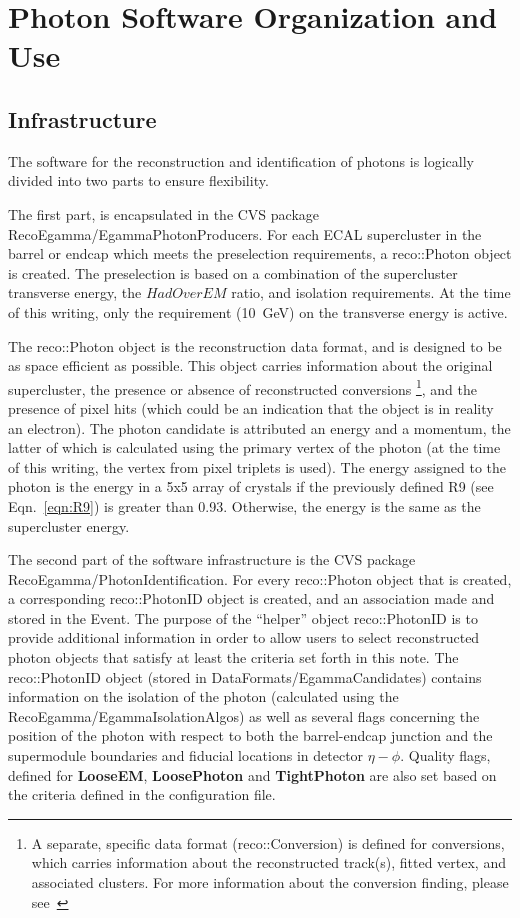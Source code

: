 \documentclass{cmspaper}
\begin{document}
\section{Photon Software Organization and Use}
\subsection{Infrastructure}
The software for the reconstruction and identification of photons is logically
divided into two parts to ensure flexibility.  


The first part, is encapsulated in the CVS package RecoEgamma/EgammaPhotonProducers.  
For each ECAL supercluster in the barrel or endcap which meets the 
preselection requirements, a reco::Photon object is created.  The preselection is based
on a combination of the supercluster transverse energy, the $HadOverEM$ ratio, and
isolation requirements.  At the time of this writing, only the requirement (10~GeV) on
the transverse energy is active.

The reco::Photon object is the reconstruction data format, and is designed to be as 
space efficient as possible. This object carries information about the original 
supercluster, the presence or absence of reconstructed conversions
\footnote{A separate, specific data format (reco::Conversion) is 
defined for conversions, which carries information about the reconstructed track(s), 
fitted vertex, and associated clusters.  For more information about the conversion
finding, please see~\cite{NancyConv}}, 
and the presence of pixel hits (which could be an indication that the object is in 
reality an electron).  The photon candidate is attributed an energy and a momentum,
the latter of which is calculated using the primary vertex of the photon (at the time
of this writing, the vertex from pixel triplets is used).  The energy assigned to the
photon is the energy in a 5x5 array of crystals if the previously defined R9 (see 
Eqn.~\ref{eqn:R9}) is greater than 0.93.  Otherwise, the energy is the same as the
supercluster energy.

The second part of the software infrastructure is the
CVS package RecoEgamma/PhotonIdentification.  For every reco::Photon object that 
is created, a corresponding reco::PhotonID object is created, and an association 
made and stored in the Event.  The purpose of the ``helper'' object reco::PhotonID is to 
provide additional information in order to allow users to select reconstructed photon 
objects that satisfy at least the criteria set forth in this note.  The reco::PhotonID 
object (stored in DataFormats/EgammaCandidates) contains information on the isolation of 
the photon (calculated using the RecoEgamma/EgammaIsolationAlgos) as well as several
flags concerning the position of the photon with respect to both the barrel-endcap junction and the 
supermodule boundaries and fiducial locations in detector $\eta-\phi$.  Quality flags, 
defined for {\bf LooseEM}, {\bf LoosePhoton} and {\bf TightPhoton} are also set based 
on the criteria defined in the configuration file.
\end{document}
